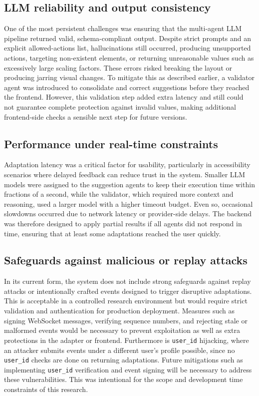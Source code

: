 \documentclass[openany]{book}
\begin{document}
\subsection{LLM reliability and output consistency}
One of the most persistent challenges was ensuring that the multi-agent LLM pipeline returned valid, schema-compliant output. Despite strict prompts and an explicit allowed-actions list, hallucinations still occurred, producing unsupported actions, targeting non-existent elements, or returning unreasonable values such as excessively large scaling factors. These errors risked breaking the layout or producing jarring visual changes. To mitigate this as described earlier, a validator agent was introduced to consolidate and correct suggestions before they reached the frontend. However, this validation step added extra latency and still could not guarantee complete protection against invalid values, making additional frontend-side checks a sensible next step for future versions.

\subsection{Performance under real-time constraints}
Adaptation latency was a critical factor for usability, particularly in accessibility scenarios where delayed feedback can reduce trust in the system. Smaller LLM models were assigned to the suggestion agents to keep their execution time within fractions of a second, while the validator, which required more context and reasoning, used a larger model with a higher timeout budget. Even so, occasional slowdowns occurred due to network latency or provider-side delays. The backend was therefore designed to apply partial results if all agents did not respond in time, ensuring that at least some adaptations reached the user quickly.

\subsection{Safeguards against malicious or replay attacks}
In its current form, the system does not include strong safeguards against replay attacks or intentionally crafted events designed to trigger disruptive adaptations. This is acceptable in a controlled research environment but would require strict validation and authentication for production deployment. Measures such as signing WebSocket messages, verifying sequence numbers, and rejecting stale or malformed events would be necessary to prevent exploitation as well as extra protections in the adapter or frontend. Furthermore is \texttt{user\_id} hijacking, where an attacker submits events under a different user’s profile possible, since no \texttt{user\_id} checks are done on returning adaptations. Future mitigations such as implementing \texttt{user\_id} verification and event signing will be necessary to address these vulnerabilities. This was intentional for the scope and development time constraints of this research.
\end{document}
